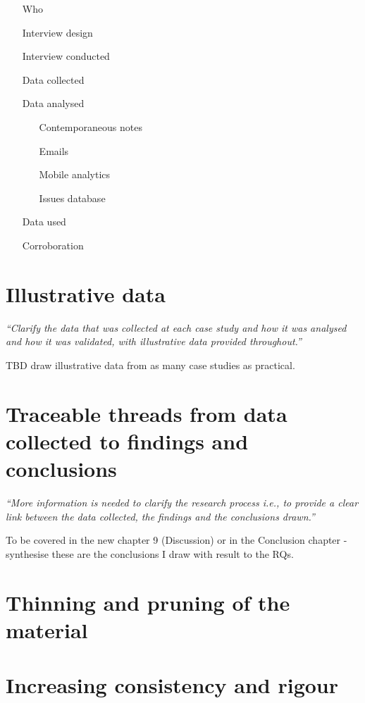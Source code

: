 \begin{itemize}
    \item[Who]
    \item[Interview design]
    \item[Interview conducted]
    \item[Data collected]
    \item[Data analysed]
    \begin{itemize}
        \item[Contemporaneous notes] 
        \item[Emails]
        \item[Mobile analytics]
        \item[Issues database]
    \end{itemize}
    \item[Data used]
    \item[Corroboration]
\end{itemize}


\section{Illustrative data}
\emph{``Clarify the data that was collected at each case study and how it was analysed and how it was validated, with illustrative data provided throughout.''}

TBD draw illustrative data from as many case studies as practical.

\section{Traceable threads from data collected to findings and conclusions}
\emph{``More information is needed to clarify the research process i.e., to provide a clear link between the data collected, the findings and the conclusions drawn.''}

To be covered in the new chapter 9 (Discussion) or in the Conclusion chapter - synthesise these are the conclusions I draw with result to the RQs.

\section{Thinning and pruning of the material}

\section{Increasing consistency and rigour}

